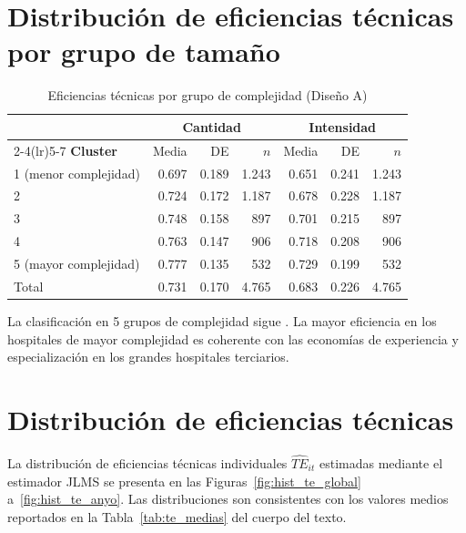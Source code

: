 \documentclass[12pt, a4paper, twoside, openright]{book}
\theoremstyle{plain}
\theoremstyle{definition}
\theoremstyle{remark}
\begin{document}
\section{Distribución de eficiencias técnicas por grupo de tamaño}

\begin{table}[htbp]
\centering
\caption{Eficiencias técnicas por grupo de complejidad (Diseño A)}
\label{tab:te_cluster}
\begin{threeparttable}
\small
\begin{tabular}{lrrrrrr}
\toprule
& \multicolumn{3}{c}{\textbf{Cantidad}} & \multicolumn{3}{c}{\textbf{Intensidad}} \\
\cmidrule(lr){2-4}\cmidrule(lr){5-7}
\textbf{Cluster} & Media & DE & $n$ & Media & DE & $n$ \\
\midrule
1 (menor complejidad) & 0.697 & 0.189 & 1.243 & 0.651 & 0.241 & 1.243 \\
2                     & 0.724 & 0.172 & 1.187 & 0.678 & 0.228 & 1.187 \\
3                     & 0.748 & 0.158 & 897   & 0.701 & 0.215 & 897   \\
4                     & 0.763 & 0.147 & 906   & 0.718 & 0.208 & 906   \\
5 (mayor complejidad) & 0.777 & 0.135 & 532   & 0.729 & 0.199 & 532   \\
\midrule
Total                 & 0.731 & 0.170 & 4.765 & 0.683 & 0.226 & 4.765 \\
\bottomrule
\end{tabular}
\begin{tablenotes}
  \small
  \item La clasificación en 5 grupos de complejidad sigue \citet{ministerio2007}. La mayor eficiencia en los hospitales de mayor complejidad es coherente con las economías de experiencia y especialización en los grandes hospitales terciarios.
\end{tablenotes}
\end{threeparttable}
\end{table}

\section{Distribución de eficiencias técnicas}
\label{sec:hist_eficiencias}

La distribución de eficiencias técnicas individuales $\widehat{TE}_{it}$ estimadas
mediante el estimador JLMS \citep{jondrow1982} se presenta en las
Figuras~\ref{fig:hist_te_global} a~\ref{fig:hist_te_anyo}.
Las distribuciones son consistentes con los valores medios reportados en la
Tabla~\ref{tab:te_medias} del cuerpo del texto.
\end{document}
